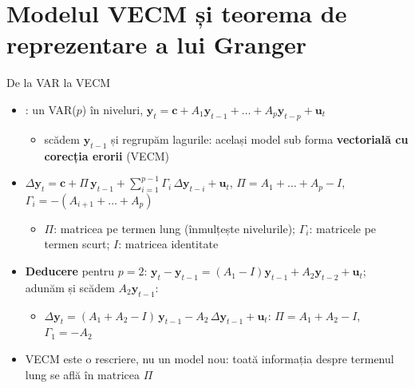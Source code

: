 \section{Modelul VECM și teorema de reprezentare a lui Granger}

\begin{frame}{De la VAR la VECM}
\itemsize{\small}
\begin{itemize}
    \item {}: un VAR($p$) în niveluri, $\mathbf y_t = \mathbf c + A_1\mathbf y_{t-1} + \dots + A_p\mathbf y_{t-p} + \mathbf u_t$
    \begin{itemize}
        \item scădem $\mathbf y_{t-1}$ și regrupăm lagurile: același model sub forma \textbf{vectorială cu corecția erorii} (VECM)
    \end{itemize}
    \item $\Delta\mathbf y_t = \mathbf c + \Pi\,\mathbf y_{t-1} + \sum_{i=1}^{p-1}\Gamma_i\,\Delta\mathbf y_{t-i} + \mathbf u_t$, \quad $\Pi = A_1 + \dots + A_p - I$, \quad $\Gamma_i = -(A_{i+1} + \dots + A_p)$
    \begin{itemize}
        \item $\Pi$: matricea pe termen lung (înmulțește nivelurile); $\Gamma_i$: matricele pe termen scurt; $I$: matricea identitate
    \end{itemize}
    \item \textbf{Deducere} pentru $p = 2$: $\mathbf y_t - \mathbf y_{t-1} = (A_1 - I)\mathbf y_{t-1} + A_2\mathbf y_{t-2} + \mathbf u_t$; adunăm și scădem $A_2\mathbf y_{t-1}$:
    \begin{itemize}
        \item $\Delta\mathbf y_t = (A_1 + A_2 - I)\,\mathbf y_{t-1} - A_2\,\Delta\mathbf y_{t-1} + \mathbf u_t$: $\Pi = A_1 + A_2 - I$, $\Gamma_1 = -A_2$
    \end{itemize}
    \item VECM este o rescriere, nu un model nou: toată informația despre termenul lung se află în matricea $\Pi$
\end{itemize}
\end{frame}

